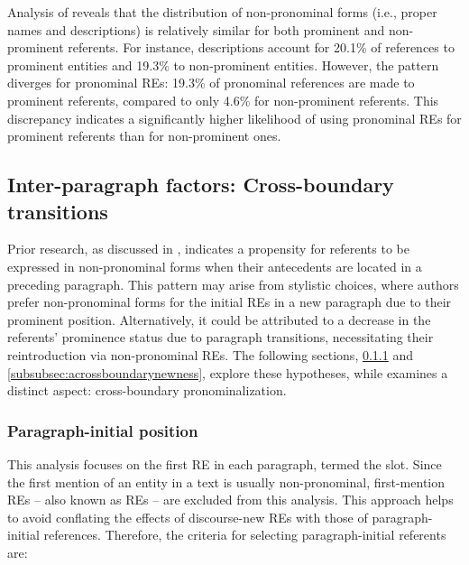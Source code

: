 


Analysis of  reveals that the distribution of non-pronominal forms (i.e., proper names and descriptions) is relatively similar for both prominent and non-prominent referents. For instance, descriptions account for 20.1\% of references to prominent entities and 19.3\% to non-prominent entities. However, the pattern diverges for pronominal REs: 19.3\% of pronominal references are made to prominent referents, compared to only 4.6\% for non-prominent referents. This discrepancy indicates a significantly higher likelihood of using pronominal REs for prominent referents than for non-prominent ones.

\subsection{Inter-paragraph factors: Cross-boundary transitions}\label{subsec:interpar}

Prior research, as discussed in , indicates a propensity for referents to be expressed in non-pronominal forms when their antecedents are located in a preceding paragraph. This pattern may arise from stylistic choices, where authors prefer non-pronominal forms for the initial REs in a new paragraph due to their prominent position. Alternatively, it could be attributed to a decrease in the referents' prominence status due to paragraph transitions, necessitating their reintroduction via non-pronominal REs. The following sections, \ref{subsubsec:acrossboundaryinitialposition} and \ref{subsubsec:acrossboundarynewness}, explore these hypotheses, while  examines a distinct aspect: cross-boundary pronominalization.

\subsubsection{Paragraph-initial position} \label{subsubsec:acrossboundaryinitialposition}

This analysis focuses on the first RE in each paragraph, termed the  slot. Since the first mention of an entity in a text is usually non-pronominal, first-mention REs -- also known as  REs -- are excluded from this analysis. This approach helps to avoid conflating the effects of discourse-new REs with those of paragraph-initial references. Therefore, the criteria for selecting paragraph-initial referents are:

